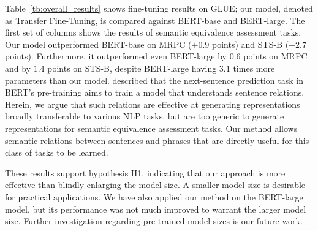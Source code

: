 \documentclass[11pt,a4paper]{article}
\newcommand{\Tref}[1]{Table~\ref{#1}}
\begin{document}
\Tref{tb:overall_results} shows fine-tuning results on GLUE; our model, denoted as Transfer Fine-Tuning, is compared against BERT-base and BERT-large. 
The first set of columns shows the results of semantic equivalence assessment tasks. 
Our model outperformed BERT-base on MRPC ($+0.9$ points) and STS-B ($+2.7$ points). 
Furthermore, it outperformed even BERT-large by $0.6$ points on MRPC and by $1.4$ points on STS-B, despite BERT-large having $3.1$ times more parameters than our model. 
 described that the next-sentence prediction task in BERT's pre-training aims to train a model that understands sentence relations. 
Herein, we argue that such relations are effective at generating representations broadly transferable to various NLP tasks, but are too generic to generate representations for semantic equivalence assessment tasks. 
Our method allows semantic relations between sentences and phrases that are directly useful for this class of tasks to be learned. 


These results support hypothesis H1, indicating that our approach is more effective than blindly enlarging the model size. 
A smaller model size is desirable for practical applications. 
We have also applied our method on the BERT-large model, but its performance was not much improved to warrant the larger model size.
Further investigation regarding pre-trained model sizes is our future work. 
\end{document}
